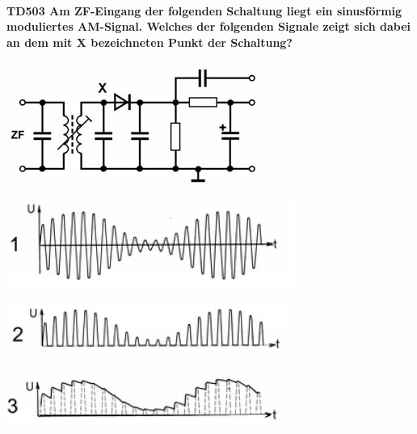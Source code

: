 \documentclass[8pt]{article}
\begin{document}
\begin{enumerate}
\begin{enumerate}[nolistsep,label=\Alph*]
\paragraph*{TD503 Am ZF-Eingang der folgenden Schaltung liegt ein sinusförmig moduliertes AM-Signal. Welches der folgenden Signale zeigt sich dabei an dem mit X bezeichneten Punkt der Schaltung?}
\begin{center}
	\begin{minipage}{\linewidth}
		\centering
		\includegraphics[scale=1.0]{pics/td503_a.jpg}
	\end{minipage}
\end{center}
\begin{center}
	\begin{minipage}{\linewidth}
		\centering
		\includegraphics[scale=1.0]{pics/td503_b.jpg}
	\end{minipage}
\end{center}
\begin{center}
	\begin{minipage}{\linewidth}
		\centering
		\includegraphics[scale=1.0]{pics/td503_c.jpg}
	\end{minipage}
\end{center}
\begin{center}
	\begin{minipage}{\linewidth}
		\centering
		\includegraphics[scale=1.0]{pics/td503_d.jpg}

\end{minipage}
\end{center}
\end{enumerate}
\end{enumerate}
\end{document}
